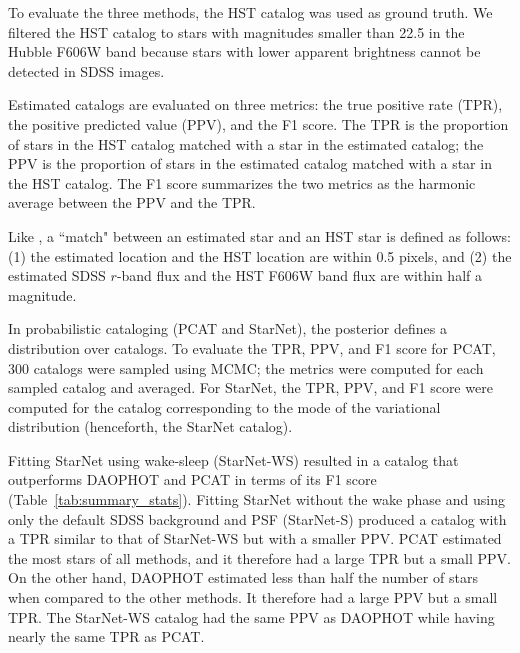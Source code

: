 To evaluate the three methods, the HST catalog was used as ground truth. 
We filtered the HST catalog to stars with magnitudes smaller than 22.5 in the Hubble F606W band because stars with lower apparent brightness cannot be detected in SDSS images. 


Estimated catalogs are evaluated on three metrics: the true positive rate (TPR), the positive predicted value (PPV), and the F1 score. The TPR is the proportion of stars in the HST catalog matched with a star in the estimated catalog;
the PPV is the proportion of stars in the estimated catalog matched with a star in the HST catalog. The F1 score summarizes the two metrics as the harmonic average between the PPV and the TPR.

Like \cite{Portillo_2017, Feder_2019}, a ``match" between an estimated star and an HST star is defined as follows: (1) the estimated location and the HST location are within 0.5 pixels, and (2) the estimated SDSS $r$-band flux and the HST F606W band flux are within half a magnitude. 

In probabilistic cataloging (PCAT and StarNet), the posterior defines a distribution over catalogs. 
To evaluate the TPR, PPV, and F1 score for PCAT, 300 catalogs were sampled using MCMC; the metrics were computed for each sampled catalog and averaged. 
For StarNet, the TPR, PPV, and F1 score were computed for the catalog corresponding to the mode of the variational distribution (henceforth, the StarNet catalog). 


Fitting StarNet using wake-sleep (StarNet-WS) resulted in a catalog that outperforms DAOPHOT and PCAT in terms of its F1 score (Table~\ref{tab:summary_stats}). 
Fitting StarNet without the wake phase
and using only the default SDSS background and PSF (StarNet-S) produced a catalog with a TPR similar to that of StarNet-WS but with a smaller PPV.
PCAT estimated the most stars of all methods, and it therefore had a large TPR but a small PPV. 
On the other hand, DAOPHOT estimated less than half the number of stars when compared to the other methods. It therefore had a large PPV but a small TPR. 
The StarNet-WS catalog had the same PPV as DAOPHOT while having nearly the same TPR as PCAT. 

